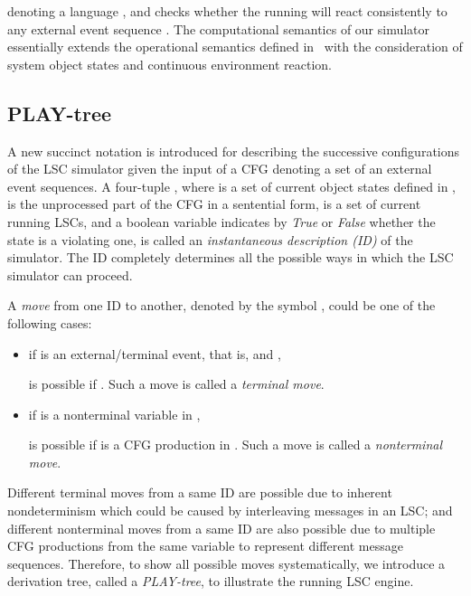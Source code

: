 \documentclass[]{llncs}
\begin{document}
denoting a language ,
and checks whether the running  will react
consistently to any external event sequence .
The computational semantics of our simulator essentially
extends the operational semantics defined in~\cite{HM03} with
the consideration of system object states and continuous
environment reaction.

\subsection{PLAY-tree}

A new succinct notation is introduced for describing the successive
configurations of the LSC simulator given the input of a CFG denoting
a set of an external event sequences.
A four-tuple ,
where  is a set of current object states defined in ,
 is the unprocessed part of the CFG in a sentential
form,  is a set of current running LSCs,
and a boolean variable  indicates by {\em True} or
{\em False} whether the state is a
violating one, is called an {\em instantaneous description (ID)}
of the simulator. The ID completely determines all the possible
ways in which the LSC simulator can proceed.

\begin{definition}[Move]
A {\em move} from one ID to another, denoted by the symbol ,
could be one of the following cases:
\begin{itemize}
\item if  is an external/terminal event, that is,  and ,
  
  is possible if .
  Such a move is called a {\em terminal move}.
\item if  is a nonterminal variable in ,
  
  is possible if  is
  a CFG production in .
  Such a move is called a {\em nonterminal move}.
\end{itemize}
\end{definition}

Different terminal moves from a same ID are possible due to
inherent nondeterminism which could be caused by interleaving
messages in an LSC;
and different nonterminal moves from a same ID are also possible
due to multiple CFG productions from
the same variable to represent different message sequences. Therefore,
to show all possible moves systematically, we introduce
a derivation tree, called a {\em PLAY-tree}, to
illustrate the running LSC engine.
\end{document}
